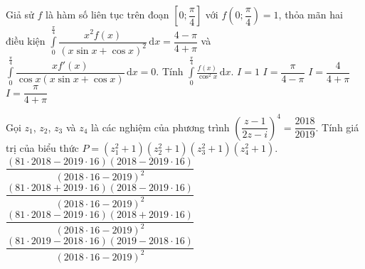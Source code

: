 	\begin{ex}%
		Giả sử $f$ là hàm số liên tục trên đoạn $\left[0;\dfrac{\pi}{4}\right]$ với $f\left(0;\dfrac{\pi}{4}\right)=1$, thỏa mãn hai điều kiện
		$\displaystyle\int\limits_0^{\frac{\pi}{4}}{\dfrac{x^2f(x)}{{(x\sin x+\cos x)}^2} \mathrm{\,d}x}=\dfrac{4-\pi}{4+\pi}$ và $\displaystyle\int\limits_0^{\frac{\pi}{4}}{\dfrac{xf'(x)}{\cos x(x\sin x+\cos x)} \mathrm{\,d}x}=0$.
		Tính $\displaystyle\int\limits_0^{\frac{\pi}{4}}{\frac{f(x)}{\cos^2x} \mathrm{\,d}x}$.
		\choice
		{\True $I=1$}
		{$I=\dfrac{\pi}{4-\pi}$}
		{$I=\dfrac{4}{4+\pi}$}
		{$I=\dfrac{\pi}{4+\pi}$}
	\end{ex}
	
	\begin{ex}%
		Gọi $z_1$, $z_2$, $z_3$ và $z_4$ là các nghiệm của phương trình ${\left(\dfrac{z-1}{2z- i}\right)}^4=\dfrac{2018}{2019}$. Tính giá trị của biểu thức $P=(z_1^2+1)(z_2^2+1)(z_3^2+1)(z_4^2+1)$.
		\choice
		{\True $\dfrac{(81\cdot 2018-2019\cdot 16)(2018-2019\cdot 16)}{{(2018\cdot 16-2019)}^2}$}
		{$\dfrac{(81\cdot 2018+2019\cdot 16)(2018-2019\cdot 16)}{{(2018\cdot 16-2019)}^2}$}
		{$\dfrac{(81\cdot 2018-2019\cdot 16)(2018+2019\cdot 16)}{{(2018\cdot 16-2019)}^2}$}
		{$\dfrac{(81\cdot 2019-2018\cdot 16)(2019-2018\cdot 16)}{{(2018\cdot 16-2019)}^2}$}
	\end{ex}
	
